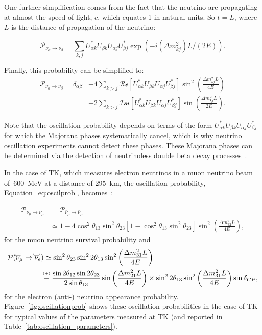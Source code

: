 One further simplification comes from the fact that the neutrino are
propagating at almost the speed of light, $c$, which equates 1 in
natural units. So $t=L$, where $L$ is the distance of propagation of
the neutrino:

\begin{equation}
  \mathcal{P}_{\nu_\alpha\rightarrow\nu_\beta}=\sum_{k,j}U^*_{\alpha k}U_{\beta k}U_{\alpha j}U^*_{\beta j}\exp\left(-i(\Delta m_{kj}^2)L/(2E)\right).
\end{equation}

Finally, this probability can be simplified to:
\begin{align}
  \label{eq:oscilprob}
  \mathcal{P}_{\nu_\alpha\rightarrow\nu_\beta} =\delta_{\alpha\beta}&-4\sum_{k>j}\mathcal{Re}\left[U^*_{\alpha k}U_{\beta k}U_{\alpha j}U^*_{\beta j} \right]\sin^2\left(\frac{\Delta m^2_{kj}L}{4E}\right)  \nonumber \\
                                                                    &+2\sum_{k>j}\mathcal{Im}\left[U^*_{\alpha k}U_{\beta k}U_{\alpha j}U^*_{\beta j}\right]\sin\left(\frac{\Delta m_{kj}^2L}{2E}\right).
\end{align}

Note that the oscillation probability depends on terms of the form
$U^*_{\alpha k}U_{\beta k}U_{\alpha j}U^*_{\beta j}$ for which the
Majorana phases systematically cancel, which is why neutrino
oscillation experiments cannot detect these phases. These Majorana
phases can be determined via the detection of neutrinoless double beta
decay processes~\cite{Furry1939}.

In the case of \Gls{TK}, which measures electron neutrinos in a muon
neutrino beam of~600~MeV at a distance of 295~km, the oscillation
probability, Equation~\ref{eq:oscilprob},
becomes~\cite{Cervera:2000kp}:

\begin{align}
  \label{eq:numu-numu}
  \mathcal{P}_{\nu_\mu\rightarrow\nu_\mu} &= \mathcal{P}_{\bar{\nu}_\mu\rightarrow\bar{\nu}_\mu}\\
                                          &\simeq 1 - 4\cos^2\theta_{13}\sin^2\theta_{23}\left[1-\cos^2\theta_{13}\sin^2\theta_{23}\right]\sin^2\left(\frac{\Delta m^2_{32}L}{4E}\right), \nonumber
\end{align}
for the muon neutrino survival probability and
\begin{align}
  \mathcal{P}(\bbar{\nu}_{\mu} \rightarrow \bbar{\nu}_e) &\simeq \sin^2\theta_{23} \sin^22\theta_{13} \sin^2\left(\frac{\Delta m^2_{31} L}{4E}\right) \nonumber \\
                                                         &\bplus{-} \text{~}\frac{\sin2\theta_{12} \sin2\theta_{23}}{2\sin\theta_{13}} \sin\left(\frac{\Delta m^2_{21} L}{4E}\right) \times \sin^22\theta_{13} \sin^2\left(\frac{\Delta m^2_{31} L}{4E}\right) \sin\delta_{CP},
  \label{eq:numu-nue}
\end{align}
for the electron (anti-) neutrino appearance
probability. Figure~\ref{fig:oscillationprob} shows these oscillation
probabilities in the case of \Gls{TK} for typical values of the
parameters measured at \Gls{TK} (and reported in
Table~\ref{tab:oscillation_parameters}).


